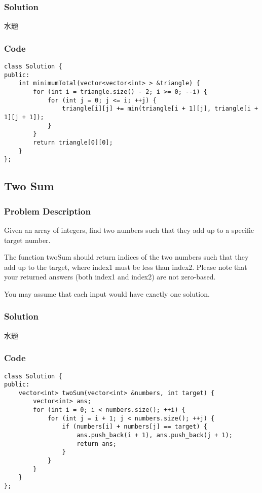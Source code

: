 \documentclass[courier]{article}
\begin{document}
\begin{CJK*}{UTF8}{gkai}
\subsubsection*{Solution}
水题

\subsubsection*{Code}
\begin{lstlisting}
class Solution {
public:
    int minimumTotal(vector<vector<int> > &triangle) {
        for (int i = triangle.size() - 2; i >= 0; --i) {
            for (int j = 0; j <= i; ++j) {
                triangle[i][j] += min(triangle[i + 1][j], triangle[i + 1][j + 1]);
            }
        }
        return triangle[0][0];
    }
}; 
\end{lstlisting}


\subsection{ Two Sum }

\subsubsection*{Problem Description}
Given an array of integers, find two numbers such that they add up to a specific target number.

The function twoSum should return indices of the two numbers such that they add up to the target, where index1 must be less than index2. Please note that your returned answers (both index1 and index2) are not zero-based.

You may assume that each input would have exactly one solution.



\subsubsection*{Solution}
水题

\subsubsection*{Code}
\begin{lstlisting}
class Solution {
public:
    vector<int> twoSum(vector<int> &numbers, int target) {
        vector<int> ans;
        for (int i = 0; i < numbers.size(); ++i) {
            for (int j = i + 1; j < numbers.size(); ++j) {
                if (numbers[i] + numbers[j] == target) {
                    ans.push_back(i + 1), ans.push_back(j + 1);
                    return ans;
                }
            }
        }
    }
}; 
\end{lstlisting}



\end{CJK*}
\end{document}
